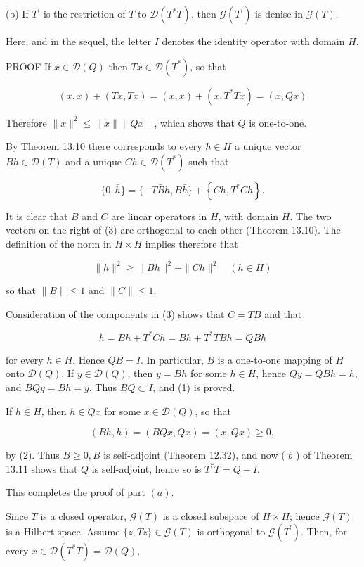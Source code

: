 \documentclass[10pt]{article}
\begin{document}
(b) If $T^{\prime}$ is the restriction of $T$ to $\mathscr{D}\left(T^{*} T\right)$, then $\mathscr{G}\left(T^{\prime}\right)$ is denise in $\mathscr{G}(T)$.

Here, and in the sequel, the letter $I$ denotes the identity operator with domain $H$.

PROOF If $x \in \mathscr{D}(Q)$ then $T x \in \mathscr{D}\left(T^{*}\right)$, so that

$$
(x, x)+(T x, T x)=(x, x)+\left(x, T^{*} T x\right)=(x, Q x)
$$

Therefore $\|x\|^{2} \leq\|x\|\|Q x\|$, which shows that $Q$ is one-to-one.

By Theorem 13.10 there corresponds to every $h \in H$ a unique vector $B h \in \mathscr{D}(T)$ and a unique $C h \in \mathscr{D}\left(T^{*}\right)$ such that

$$
\{0, \bar{h}\}=\{-T \bar{B} h, B \bar{h}\}+\left\{C h, T^{*} C h\right\} .
$$

It is clear that $B$ and $C$ are lincar operators in $H$, with domain $H$. The two vectors on the right of (3) are orthogonal to each other (Theorem 13.10). The definition of the norm in $H \times H$ implies therefore that

$$
\|h\|^{2} \geq\|B h\|^{2}+\|C h\|^{2} \quad(h \in H)
$$

so that $\|B\| \leq 1$ and $\|C\| \leq 1$.

Consideration of the components in (3) shows that $C=T B$ and that

$$
h=B h+T^{*} C h=B h+T^{*} T B h=Q B h
$$

for every $h \in H$. Hence $Q B=I$. In particular, $B$ is a one-to-one mapping of $H$ onto $\mathscr{D}(Q)$. If $y \in \mathscr{D}(Q)$, then $y=B h$ for some $h \in H$, hence $Q y=Q B h=h$, and $B Q y=B h=y$. Thus $B Q \subset I$, and (1) is proved.

If $h \in H$, then $h \in Q x$ for some $x \in \mathscr{D}(Q)$, so that

$$
(B h, h)=(B Q x, Q x)=(x, Q x) \geq 0,
$$

by (2). Thus $B \geq 0, B$ is self-adjoint (Theorem 12.32), and now ( $b$ ) of Theorem 13.11 shows that $Q$ is self-adjoint, hence so is $T^{*} T=Q-I$.

This completes the proof of part $(a)$.

Since $T$ is a closed operator, $\mathscr{G}(T)$ is a closed subspace of $H \times H$; hence $\mathscr{G}(T)$ is a Hilbert space. Assume $\{z, T z\} \in \mathscr{G}(T)$ is orthogonal to $\mathscr{G}\left(T^{\prime}\right)$. Then, for every $x \in \mathscr{D}\left(T^{*} T\right)=\mathscr{D}(Q)$,
\end{document}
